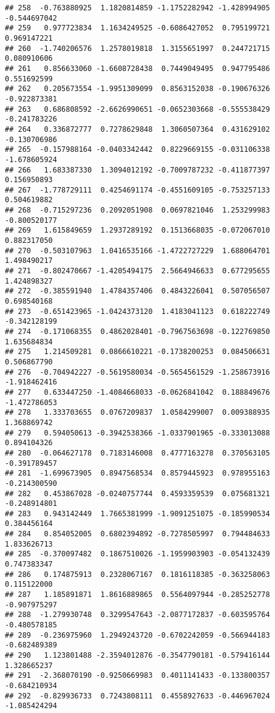 \documentclass[
]{article}
\begin{document}
\begin{verbatim}
## 258  -0.763880925  1.1820814859 -1.1752282942 -1.428994905 -0.544697042
## 259   0.977723834  1.1634249525 -0.6086427052  0.795199721  0.969147221
## 260  -1.740206576  1.2578019818  1.3155651997  0.244721715  0.080910606
## 261   0.856633060 -1.6608728438  0.7449049495  0.947795486  0.551692599
## 262   0.205673554 -1.9951309099  0.8563152038 -0.190676326 -0.922873381
## 263   0.686808592 -2.6626990651 -0.0652303668 -0.555538429 -0.241783226
## 264   0.336872777  0.7278629848  1.3060507364  0.431629102 -0.130706986
## 265  -0.157988164 -0.0403342442  0.8229669155 -0.031106338 -1.678605924
## 266   1.683387330  1.3094012192 -0.7009787232 -0.411877397  0.156950893
## 267  -1.778729111  0.4254691174 -0.4551609105 -0.753257133  0.504619882
## 268  -0.715297236  0.2092051908  0.0697821046  1.253299983 -0.800520177
## 269   1.615849659  1.2937289192  0.1513668035 -0.072067010  0.882317050
## 270  -0.503107963  1.0416535166 -1.4722727229  1.688064701  1.498490217
## 271  -0.802470667 -1.4205494175  2.5664946633  0.677295655  1.424898327
## 272  -0.385591940  1.4784357406  0.4843226041  0.507056507  0.698540168
## 273  -0.651423965 -1.0424373120  1.4183041123  0.618222749 -0.342128199
## 274  -0.171068355  0.4862028401 -0.7967563698 -0.122769850  1.635684834
## 275   1.214509281  0.0866610221 -0.1738200253  0.084506631  0.506867790
## 276  -0.704942227 -0.5619580034 -0.5654561529 -1.258673916 -1.918462416
## 277   0.633447250 -1.4084668033 -0.0626841042  0.188849676 -1.472786053
## 278   1.333703655  0.0767209837  1.0584299007  0.009388935  1.368869742
## 279   0.594050613 -0.3942538366 -1.0337901965 -0.333013088  0.894104326
## 280  -0.064627178  0.7183146008  0.4777163278  0.370563105 -0.391789457
## 281  -1.699673905  0.8947568534  0.8579445923  0.978955163 -0.214300590
## 282   0.453867028 -0.0240757744  0.4593359539  0.075681321 -0.248914801
## 283   0.943142449  1.7665381999 -1.9091251075 -0.185990534  0.384456164
## 284   0.854052005  0.6802394892 -0.7278505997  0.794484633  1.833626713
## 285  -0.370097482  0.1867510026 -1.1959903903 -0.054132439  0.747383347
## 286   0.174875913  0.2328067167  0.1816118385 -0.363258063  0.115122000
## 287   1.185891871  1.8616889865  0.5564097944 -0.285252778 -0.907975297
## 288  -1.279930748  0.3299547643 -2.0877172837 -0.603595764 -0.480578185
## 289  -0.236975960  1.2949243720 -0.6702242059 -0.566944183 -0.682489389
## 290   1.123801488 -2.3594012876 -0.3547790181 -0.579416144  1.328665237
## 291  -2.368070190 -0.9250669983  0.4011141433 -0.133800357 -0.684210934
## 292  -0.829936733  0.7243808111  0.4558927633 -0.446967024 -1.085424294

\end{verbatim}
\end{document}
